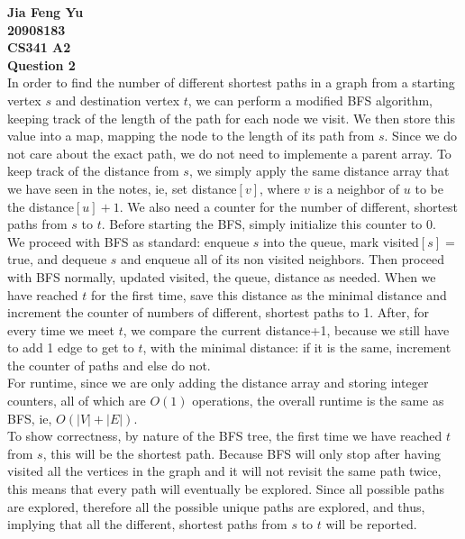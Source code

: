 \documentclass[12pt]{article}
\begin{document}
	\textbf{
		{\Large Jia Feng Yu \\ 20908183\\ CS341 A2 \\ Question 2}
	}\\
	In order to find the number of different shortest paths in a graph from a starting vertex $s$ and destination vertex $t$, we can perform a modified BFS algorithm, keeping track of the length of the path for each node we visit. We then store this value into a map, mapping the node to the length of its path from $s$. Since we do not care about the exact path, we do not need to implemente a parent array. To keep track of the distance from $s$, we simply apply the same distance array that we have seen in the notes, ie, set distance$[v]$, where $v$ is a neighbor of $u$ to be the distance$[u]+1$. We also need a counter for the number of different, shortest paths from $s$ to $t$. Before starting the BFS, simply initialize this counter to 0.\\
	We proceed with BFS as standard: enqueue $s$ into the queue, mark visited$[s]= $ true, and dequeue $s$ and enqueue all of its non visited neighbors. Then proceed with BFS normally, updated visited, the queue, distance as needed. When we have reached $t$ for the first time, save this distance as the minimal distance and increment the counter of numbers of different, shortest paths to 1. After, for every time we meet $t$, we compare the current distance+1, because we still have to add 1 edge to get to $t$, with the minimal distance: if it is the same, increment the counter of paths and else do not.\\
	For runtime, since we are only adding the distance array and storing integer counters, all of which are $O(1)$ operations, the overall runtime is the same as BFS, ie, $O(|V|+|E|)$.\\
	To show correctness, by nature of the BFS tree, the first time we have reached $t$ from $s$, this will be the shortest path. Because BFS will only stop after having visited all the vertices in the graph and it will not revisit the same path twice, this means that every path will eventually be explored. Since all possible paths are explored, therefore all the possible unique paths are explored, and thus, implying that all the different, shortest paths from $s$ to $t$ will be reported.
	
\end{document}
